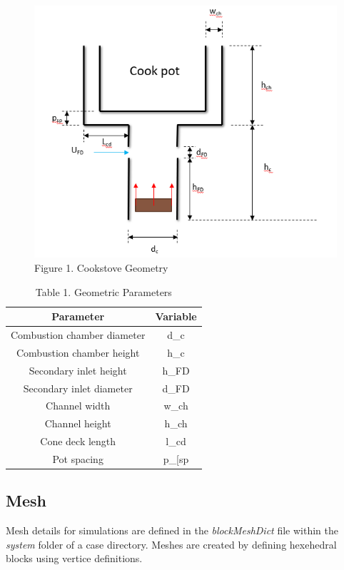 \documentclass[3p,times,twocolumn]{elsarticle}
\begin{document}
\begin{figure}{\linewidth}
	\includegraphics[width=\linewidth]{geometryfrompres.PNG}
	\centering
	\caption{Figure 1. Cookstove Geometry}
\end{figure}



\begin{table}{\linewidth}
	\centering
	\begin{tabular}{||c c||} 
		  \hline
		   Parameter & Variable \\ [0.4ex] 
		    \hline\hline
		     Combustion chamber diameter & d_{c} \\ 
		     Combustion chamber height & h_{c} \\
		     Secondary inlet height & h_{FD} \\
		     Secondary inlet diameter & d_{FD} \\
		     Channel width & w_{ch} \\ [1ex] 
	             Channel height & h_{ch} \\ [1ex]
		     Cone deck length & l_{cd} \\ [1ex]
	             Pot spacing & p_[sp} \\ [1ex]
		     \hline
		     \end{tabular}
		     \caption{Table 1. Geometric Parameters}
	   
\end{table}


\subsection{Mesh}
Mesh details for simulations are defined in the \textit{blockMeshDict} file within the \textit{system} folder of a case directory. Meshes are created by defining hexehedral blocks using vertice definitions.
\end{document}
